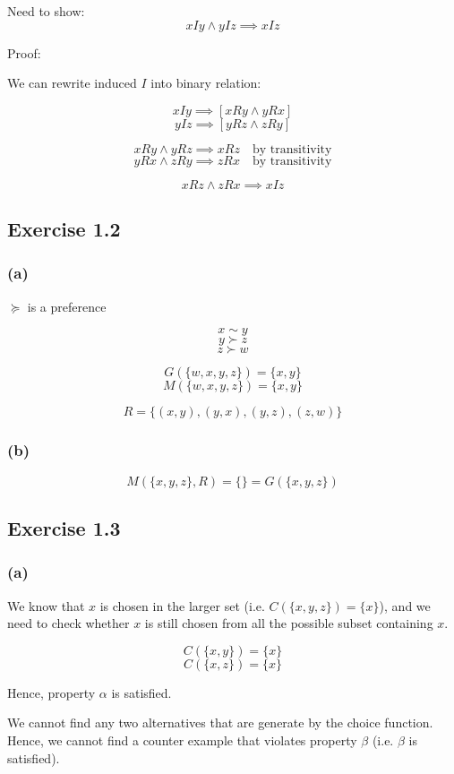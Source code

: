 \documentclass[a4paper]{article}
\begin{document}
Need to show:
\[xIy \land yIz \implies xIz \]

Proof:

We can rewrite induced $I$ into binary relation:

\[xIy\implies [xRy \land yRx] \]
\[yIz\implies [yRz \land zRy] \]

\[xRy \land yRz \implies xRz \quad \text{by transitivity} \]
\[yRx \land zRy \implies zRx \quad \text{by transitivity} \]

\[xRz \land zRx \implies xIz \]


\subsection*{Exercise 1.2}

\subsubsection*{(a)}

$\succeq$ is a preference

\[x\sim y \]
\[y\succ z \]
\[z\succ w \]

\[G(\{w,x,y,z\})=\{x,y\} \]
\[M(\{w,x,y,z\})=\{x,y\} \]

\[R=\{(x,y), (y,x), (y,z), (z,w) \} \]

\subsubsection*{(b)}

\[M(\{x,y,z\}, R)=\{\}=G(\{x,y,z\}) \]

\subsection*{Exercise 1.3}

\subsubsection*{(a)}

We know that $x$ is chosen in the larger set (i.e. $C(\{x,y,z\})=\{x\}$), and we need to check whether $x$ is still chosen from all the possible subset containing $x$.

\[C(\{x,y\})=\{x\} \]
\[C(\{x,z\})=\{x\} \]

Hence, property $\alpha$ is satisfied.

We cannot find any two alternatives that are generate by the choice function. Hence, we cannot find a counter example that violates property $\beta$ (i.e. $\beta$ is satisfied).
\end{document}
